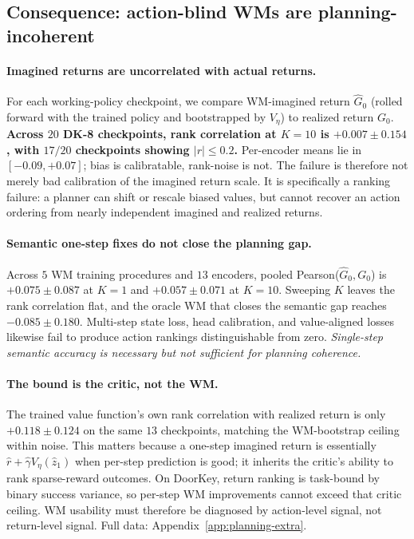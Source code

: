 \documentclass{article}
\begin{document}
\subsection{Consequence: action-blind WMs are planning-incoherent}\label{sec:planning-ceiling}

\paragraph{Imagined returns are uncorrelated with actual returns.} For each working-policy checkpoint, we compare WM-imagined return $\hat G_0$ (rolled forward with the trained policy and bootstrapped by $V_\eta$) to realized return $G_0$. \textbf{Across $20$ DK-8 checkpoints, rank correlation at $K{=}10$ is $+0.007 \pm 0.154$, with $17/20$ checkpoints showing $|r| \leq 0.2$.} Per-encoder means lie in $[-0.09,+0.07]$; bias is calibratable, rank-noise is not. The failure is therefore not merely bad calibration of the imagined return scale. It is specifically a ranking failure: a planner can shift or rescale biased values, but cannot recover an action ordering from nearly independent imagined and realized returns.

\paragraph{Semantic one-step fixes do not close the planning gap.} Across $5$ WM training procedures and $13$ encoders, pooled Pearson($\hat G_0,G_0$) is $\mathbf{+0.075\pm0.087}$ at $K{=}1$ and $+0.057\pm0.071$ at $K{=}10$. Sweeping $K$ leaves the rank correlation flat, and the oracle WM that closes the semantic gap reaches $-0.085\pm0.180$. Multi-step state loss, head calibration, and value-aligned losses likewise fail to produce action rankings distinguishable from zero. \emph{Single-step semantic accuracy is necessary but not sufficient for planning coherence.}

\paragraph{The bound is the critic, not the WM.} The trained value function's own rank correlation with realized return is only $\mathbf{+0.118\pm0.124}$ on the same $13$ checkpoints, matching the WM-bootstrap ceiling within noise. This matters because a one-step imagined return is essentially $\hat r+\hat\gamma V_\eta(\hat z_1)$ when per-step prediction is good; it inherits the critic's ability to rank sparse-reward outcomes. On DoorKey, return ranking is task-bound by binary success variance, so per-step WM improvements cannot exceed that critic ceiling. WM usability must therefore be diagnosed by action-level signal, not return-level signal. Full data: Appendix~\ref{app:planning-extra}.
\end{document}
